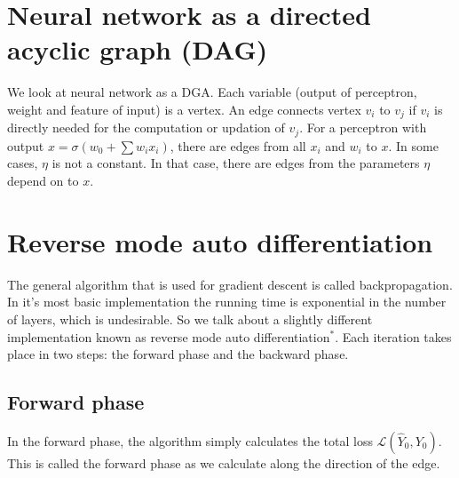 \section{Neural network as a directed acyclic graph (DAG)}
We look at neural network as a DGA. Each variable (output of perceptron, weight and feature of input) is a vertex. An edge connects vertex $v_i$ to $v_j$ if $v_i$ is directly needed for the computation or updation of $v_j$. For a perceptron with output $x=\sigma\left(w_0+\sum w_ix_i\right)$, there are edges from all $x_i$ and $w_i$ to $x$. In some cases, $\eta$ is not a constant. In that case, there are edges from the parameters $\eta$ depend on to $x$.

\section{Reverse mode auto differentiation}
The general algorithm that is used for gradient descent is called backpropagation. In it's most basic implementation the running time is exponential in the number of layers, which is undesirable. So we talk about a slightly different implementation known as reverse mode auto differentiation$^*$. Each iteration takes place in two steps: the forward phase and the backward phase. 
\subsection{Forward phase}
In the forward phase, the algorithm simply calculates the total loss $\mathcal L(\hat Y_0,Y_0)$. This is called the forward phase as we calculate along the direction of the edge. 

